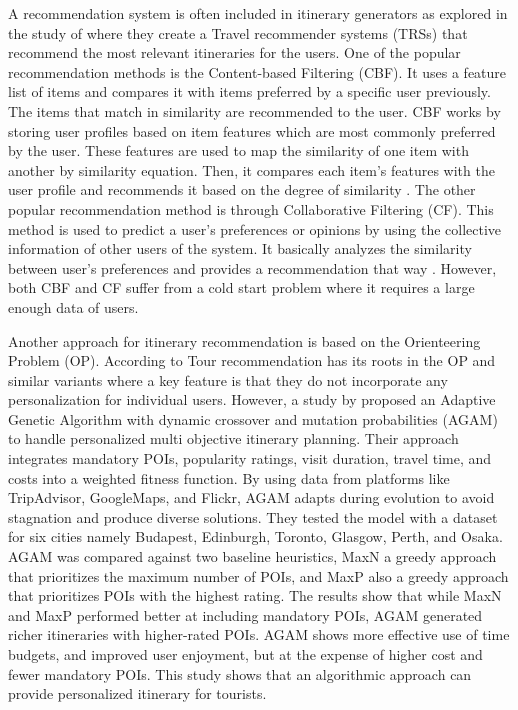 A recommendation system is often included in itinerary generators as explored in the study of \textcite{Otaki2025} where they create a Travel recommender systems (TRSs) that recommend the most relevant itineraries for the users. One of the popular recommendation methods is the Content-based Filtering (CBF). It uses a feature list of items and compares it with items preferred by a specific user previously. The items that match in similarity are recommended to the user. CBF works by storing user profiles based on item features which are most commonly preferred by the user. These features are used to map the similarity of one item with another by similarity equation. Then, it compares each item’s features with the user profile and recommends it based on the degree of similarity \parencite{Raghuwanshi2019}.  The other popular recommendation method is through Collaborative Filtering (CF). This method is used to predict a user’s preferences or opinions by using the collective information of other users of the system. It basically analyzes the similarity between user’s preferences and provides a recommendation that way \parencite{Li2023,Widayanti2023}. However, both CBF and CF suffer from a cold start problem where it requires a large enough data of users.

Another approach for itinerary recommendation is based on the Orienteering Problem (OP). According to \textcite{Lim2019} Tour recommendation has its roots in the OP and similar variants where a key feature is that they do not incorporate any personalization for individual users. However, a study by \textcite{Yochum2020} proposed an Adaptive Genetic Algorithm with dynamic crossover and mutation probabilities (AGAM) to handle personalized multi objective itinerary planning. Their approach integrates mandatory POIs, popularity ratings, visit duration, travel time, and costs into a weighted fitness function. By using data from platforms like TripAdvisor, GoogleMaps, and Flickr, AGAM adapts during evolution to avoid stagnation and produce diverse solutions. They tested the model with a dataset for six cities namely Budapest, Edinburgh, Toronto, Glasgow, Perth, and Osaka. AGAM was compared against two baseline heuristics, MaxN a greedy approach that prioritizes the maximum number of POIs, and MaxP also a greedy approach that prioritizes POIs with the highest rating. The results show that while MaxN and MaxP performed better at including mandatory POIs, AGAM generated richer itineraries with higher-rated POIs. AGAM shows more effective use of time budgets, and improved user enjoyment, but at the expense of higher cost and fewer mandatory POIs. This study shows that an algorithmic approach can provide personalized itinerary for tourists.

